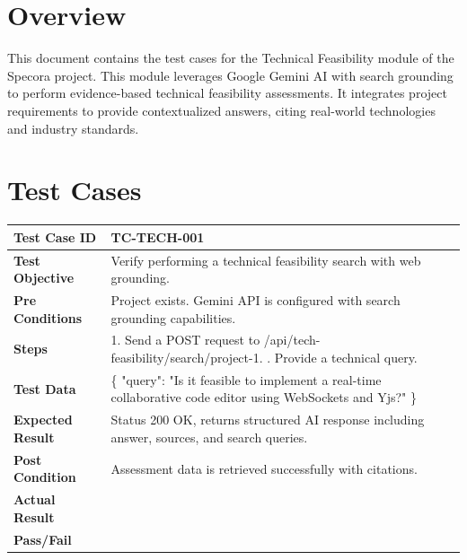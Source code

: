 \section{Overview}
This document contains the test cases for the Technical Feasibility module of the Specora project. This module leverages Google Gemini AI with search grounding to perform evidence-based technical feasibility assessments. It integrates project requirements to provide contextualized answers, citing real-world technologies and industry standards.

\section{Test Cases}

\begin{longtable}{|p{}|p{}|}
\hline
\textbf{Test Case ID} & TC-TECH-001 \\ \hline
\textbf{Test Objective} & Verify performing a technical feasibility search with web grounding. \\ \hline
\textbf{Pre Conditions} & Project exists. Gemini API is configured with search grounding capabilities. \\ \hline
\textbf{Steps} & 
1. Send a POST request to /api/tech-feasibility/search/project-1. \newline
2. Provide a technical query. \\ \hline
\textbf{Test Data} & \{ "query": "Is it feasible to implement a real-time collaborative code editor using WebSockets and Yjs?" \} \\ \hline
\textbf{Expected Result} & Status 200 OK, returns structured AI response including answer, sources, and search queries. \\ \hline
\textbf{Post Condition} & Assessment data is retrieved successfully with citations. \\ \hline
\textbf{Actual Result} &  \\ \hline
\textbf{Pass/Fail} &  \\ \hline
\end{longtable}

